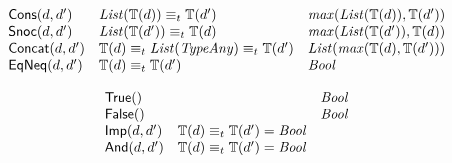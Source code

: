 \documentclass[fleqn,a4paper,dvips]{article}
\newcommand{\aterm}[1]{\mathsf{#1}}
\newcommand{\type}{\mathbb{T}}
\newcommand{\List}{\nm{List}}
\newcommand{\TypeAny}{\nm{TypeAny}}
\newcommand{\typecompat}{\equiv_t}
\begin{document}
{\begin{displaymath}
\begin{array}{lll}
\aterm{Cons}(d, d')                  & \List(\type(d))\typecompat\type(d')                        & \nm{max}(\List(\type(d)),\type(d'))\\
\aterm{Snoc}(d, d')                  & \List(\type(d'))\typecompat\type(d)                        & \nm{max}(\List(\type(d')),\type(d))\\
\aterm{Concat}(d, d')                & \type(d)\typecompat\List(\TypeAny)\typecompat\type(d')     & \List(\nm{max}(\type(d),\type(d')))\\
\aterm{EqNeq}(d, d')                 & \type(d)\typecompat\type(d')                               & \Bool
\end{array}
\end{displaymath}

\begin{displaymath}
\begin{array}{lll}
\aterm{True}()                       &                                                            & \Bool\\
\aterm{False}()                      &                                                            & \Bool\\
\aterm{Imp}(d, d')                   & \type(d)\typecompat\type(d')=\Bool                         &\\
\aterm{And}(d, d')                   & \type(d)\typecompat\type(d')=\Bool                         &
\end{array}
\end{displaymath}

}
\end{document}
